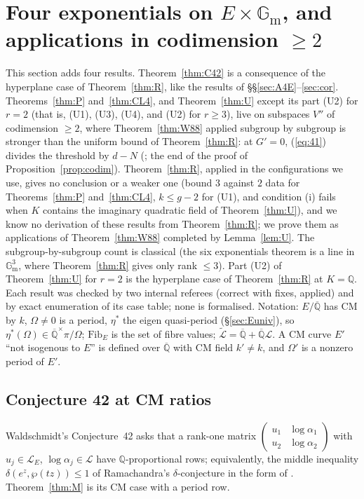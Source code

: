 \documentclass[11pt]{amsart}
\theoremstyle{definition}
\newcommand{\Qb}{\overline{\mathbb{Q}}}
\newcommand{\Q}{\mathbb{Q}}
\newcommand{\Gm}{\mathbb{G}_{\mathrm m}}
\newcommand{\Lg}{\mathcal{L}}
\newcommand{\Lt}{\widetilde{\mathcal{L}}}
\newcommand{\Fib}{\mathrm{Fib}}
\begin{document}
\section{Four exponentials on $E\times\Gm$, and applications in codimension $\ge2$}\label{sec:H2}
This section adds four results. Theorem~\ref{thm:C42} is a consequence of the hyperplane case of Theorem~\ref{thm:R}, like the
results of \S\S\ref{sec:A4E}--\ref{sec:cor}. Theorems~\ref{thm:P} and~\ref{thm:CL4}, and Theorem~\ref{thm:U} except its
part (U2) for $r=2$ (that is, (U1), (U3), (U4), and (U2) for $r\ge3$), live on subspaces $V''$ of codimension $\ge2$, where
Theorem~\ref{thm:W88} applied subgroup by subgroup is stronger than the uniform bound of Theorem~\ref{thm:R}: at $G'=0$,
(\ref{eq:41}) divides the threshold by $d-N$ (\cite[(4.2)]{W88}; the end of the proof of Proposition~\ref{prop:codim}).
Theorem~\ref{thm:R}, applied in the configurations we use, gives no conclusion or a weaker one (bound $3$ against $2$ data
for Theorems~\ref{thm:P} and~\ref{thm:CL4}, $k\le g-2$ for (U1), and condition (i) fails when $K$ contains the
imaginary quadratic field of Theorem~\ref{thm:U}), and we
know no derivation of these results from Theorem~\ref{thm:R}; we prove them as applications of Theorem~\ref{thm:W88}
completed by Lemma~\ref{lem:U}. The subgroup-by-subgroup count is classical (the six exponentials theorem is a line in
$\Gm^3$, where Theorem~\ref{thm:R} gives only rank $\le3$). Part (U2) of Theorem~\ref{thm:U} for $r=2$ is the hyperplane
case of Theorem~\ref{thm:R} at $K=\Q$. Each result was checked by two
internal referees (correct with fixes, applied) and by exact enumeration of its case table; none is formalised. Notation:
$E/\Qb$ has CM by $k$, $\Omega\ne0$ is a period, $\eta^*$ the eigen quasi-period (\S\ref{sec:Euniv}), so
$\eta^*(\Omega)\in\Qb^\times\pi/\Omega$; $\Fib_E$ is the set of fibre values; $\Lt=\Qb+\Qb\Lg$. A CM curve $E'$ ``not isogenous
to $E$'' is defined over $\Qb$ with CM field $k'\ne k$, and $\Omega'$ is a nonzero period of $E'$.

\subsection{Conjecture 42 at CM ratios}\label{sec:C42}
Waldschmidt's Conjecture~42 \cite[p.~173]{W06} asks that a rank-one matrix $\left(\begin{smallmatrix}u_1&\log\alpha_1\\
u_2&\log\alpha_2\end{smallmatrix}\right)$ with $u_j\in\Lg_E$, $\log\alpha_j\in\Lg$ have $\Q$-proportional rows; equivalently,
the middle inequality $\delta(e^z,\wp(tz))\le1$ of Ramachandra's $\delta$-conjecture in the form of \cite[\S2(a)]{W13}.
Theorem~\ref{thm:M} is its CM case with a period row.
\end{document}
